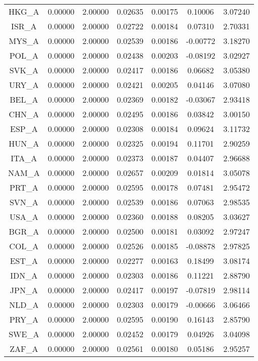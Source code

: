 \begin{longtable}{c c c c c c c}
HKG_A & 0.00000 & 2.00000 & 0.02635 & 0.00175 & 0.10006 & 3.07240 \\
ISR_A & 0.00000 & 2.00000 & 0.02722 & 0.00184 & 0.07310 & 2.70331 \\
MYS_A & 0.00000 & 2.00000 & 0.02539 & 0.00186 & -0.00772 & 3.18270 \\
POL_A & 0.00000 & 2.00000 & 0.02438 & 0.00203 & -0.08192 & 3.02927 \\
SVK_A & 0.00000 & 2.00000 & 0.02417 & 0.00186 & 0.06682 & 3.05380 \\
URY_A & 0.00000 & 2.00000 & 0.02421 & 0.00205 & 0.04146 & 3.07080 \\
BEL_A & 0.00000 & 2.00000 & 0.02369 & 0.00182 & -0.03067 & 2.93418 \\
CHN_A & 0.00000 & 2.00000 & 0.02495 & 0.00186 & 0.03842 & 3.00150 \\
ESP_A & 0.00000 & 2.00000 & 0.02308 & 0.00184 & 0.09624 & 3.11732 \\
HUN_A & 0.00000 & 2.00000 & 0.02325 & 0.00194 & 0.11701 & 2.90259 \\
ITA_A & 0.00000 & 2.00000 & 0.02373 & 0.00187 & 0.04407 & 2.96688 \\
NAM_A & 0.00000 & 2.00000 & 0.02657 & 0.00209 & 0.01814 & 3.05078 \\
PRT_A & 0.00000 & 2.00000 & 0.02595 & 0.00178 & 0.07481 & 2.95472 \\
SVN_A & 0.00000 & 2.00000 & 0.02539 & 0.00186 & 0.07063 & 2.98535 \\
USA_A & 0.00000 & 2.00000 & 0.02360 & 0.00188 & 0.08205 & 3.03627 \\
BGR_A & 0.00000 & 2.00000 & 0.02500 & 0.00181 & 0.03092 & 2.97247 \\
COL_A & 0.00000 & 2.00000 & 0.02526 & 0.00185 & -0.08878 & 2.97825 \\
EST_A & 0.00000 & 2.00000 & 0.02277 & 0.00163 & 0.18499 & 3.08174 \\
IDN_A & 0.00000 & 2.00000 & 0.02303 & 0.00186 & 0.11221 & 2.88790 \\
JPN_A & 0.00000 & 2.00000 & 0.02417 & 0.00197 & -0.07819 & 2.98114 \\
NLD_A & 0.00000 & 2.00000 & 0.02303 & 0.00179 & -0.00666 & 3.06466 \\
PRY_A & 0.00000 & 2.00000 & 0.02595 & 0.00190 & 0.16143 & 2.85790 \\
SWE_A & 0.00000 & 2.00000 & 0.02452 & 0.00179 & 0.04926 & 3.04098 \\
ZAF_A & 0.00000 & 2.00000 & 0.02561 & 0.00180 & 0.05186 & 2.95257 \\

\end{longtable}
